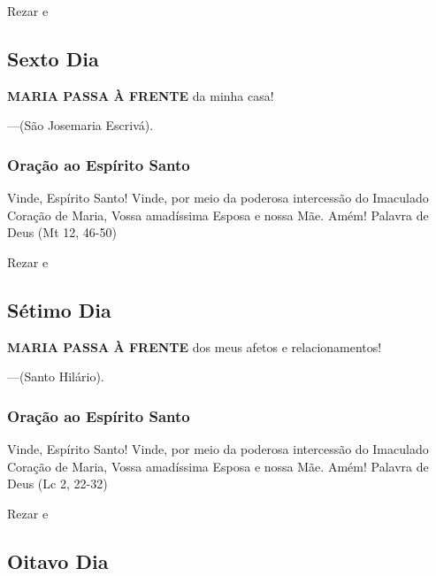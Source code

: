 \documentclass[a4paper,14pt]{extarticle} \usepackage[utf8]{inputenc}
\begin{document}
Rezar \textbf{} e \textbf{}


\subsection{Sexto Dia}

\noindent

\textbf{MARIA PASSA À FRENTE} da minha casa!


---(São Josemaria Escrivá).

\subsubsection*{Oração ao Espírito Santo}
Vinde, Espírito Santo! Vinde, por meio da poderosa intercessão do
Imaculado Coração de Maria, Vossa amadíssima Esposa e nossa Mãe.
Amém!
Palavra de Deus (Mt 12, 46-50)

Rezar \textbf{} e \textbf{}

\subsection{Sétimo Dia}

\noindent

\textbf{MARIA PASSA À FRENTE} dos meus afetos e relacionamentos!


---(Santo Hilário).

\subsubsection*{Oração ao Espírito Santo}
Vinde, Espírito Santo! Vinde, por meio da poderosa intercessão do
Imaculado Coração de Maria, Vossa amadíssima Esposa e nossa Mãe.
Amém!
Palavra de Deus (Lc 2, 22-32)

Rezar \textbf{} e \textbf{}

\subsection{Oitavo Dia}
\end{document}
